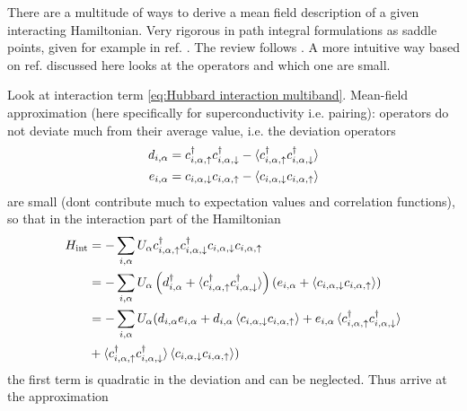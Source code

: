 \documentclass[../notes.tex]{subfiles}
\begin{document}
There are a multitude of ways to derive a mean field description of a given interacting Hamiltonian.
Very rigorous in path integral formulations as saddle points, given for example in ref. \cite{colemanIntroductionManyBodyPhysics2015}.
The review follows \cite{huhtinenSuperconductivityNormalState2023}.
A more intuitive way based on ref. \cite{bruusManyBodyQuantumTheory2004} discussed here looks at the operators and which one are small. 

Look at interaction term \cref{eq:Hubbard interaction multiband}.
Mean-field approximation (here specifically for superconductivity i.e. pairing): operators do not deviate much from their average value, i.e. the deviation operators 
\begin{align}
	d_{i, \alpha} = c_{i, \alpha, \uparrow}^{\dagger} c_{i, \alpha, \downarrow}^{\dagger} - \braket{c_{i, \alpha, \uparrow}^{\dagger} c_{i, \alpha, \downarrow}^{\dagger}} \\
	e_{i, \alpha} = c_{i, \alpha, \downarrow} c_{i, \alpha, \uparrow} - \braket{c_{i, \alpha, \downarrow} c_{i, \alpha, \uparrow}}
\end{align}
are small (dont contribute much to expectation values and correlation functions), so that in the interaction part of the Hamiltonian
\begin{align}
	H_{\mathrm{int}} &= -\sum_{i, \alpha} U_{\alpha} c_{i, \alpha, \uparrow}^{\dagger} c_{i, \alpha, \downarrow}^{\dagger} c_{i, \alpha, \downarrow} c_{i, \alpha, \uparrow} \\
	&= -\sum_{i, \alpha} U_{\alpha} 
	\left( d_{i, \alpha}^{\dagger} + \braket{c_{i, \alpha, \uparrow}^{\dagger} c_{i, \alpha, \downarrow}^{\dagger}} \right)
	\left( e_{i, \alpha} + \braket{c_{i, \alpha, \downarrow} c_{i, \alpha, \uparrow}} \right) \\
	&= -\sum_{i, \alpha} U_{\alpha} (
		d_{i, \alpha} e_{i, \alpha}
		+ d_{i, \alpha} \braket{c_{i, \alpha, \downarrow} c_{i, \alpha, \uparrow}}
		+ e_{i, \alpha} \braket{c_{i, \alpha, \uparrow}^{\dagger} c_{i, \alpha, \downarrow}^{\dagger}} \\
		&+ \braket{c_{i, \alpha, \uparrow}^{\dagger} c_{i, \alpha, \downarrow}^{\dagger}} \braket{c_{i, \alpha, \downarrow} c_{i, \alpha, \uparrow}} )
\end{align}
the first term is quadratic in the deviation and can be neglected.
Thus arrive at the approximation
\end{document}
